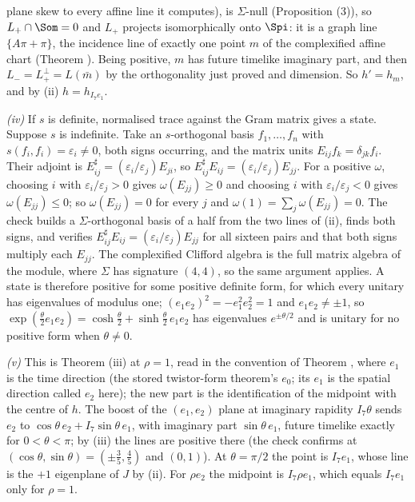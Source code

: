 plane skew to every affine line it computes), is $\Sigma$-null (Proposition (3)), so $L_{+} \cap \Som = 0$ and $L_{+}$ projects isomorphically onto $\Spi$: it is a graph line $\{A\pi + \pi\}$, the incidence line of exactly one point $m$ of the complexified affine chart (Theorem ). Being positive, $m$ has future timelike imaginary part, and then $L_{-} = L_{+}^{\perp} = L(\bar m)$ by the orthogonality just proved and dimension. So $h' = h_{m}$, and by (ii) $h = h_{I_{7}e_{1}}$.

\emph{(iv)} If $s$ is definite, normalised trace against the Gram matrix gives a state. Suppose $s$ is indefinite. Take an $s$-orthogonal basis $f_{1}, \dots, f_{n}$ with $s(f_{i}, f_{i}) = \varepsilon_{i} \ne 0$, both signs occurring, and the matrix units $E_{ij}f_{k} = \delta_{jk}f_{i}$. Their adjoint is $E_{ij}^{\sharp} = (\varepsilon_{i}/\varepsilon_{j})E_{ji}$, so $E_{ij}^{\sharp}E_{ij} = (\varepsilon_{i}/\varepsilon_{j})E_{jj}$. For a positive $\omega$, choosing $i$ with $\varepsilon_{i}/\varepsilon_{j} > 0$ gives $\omega(E_{jj}) \ge 0$ and choosing $i$ with $\varepsilon_{i}/\varepsilon_{j} < 0$ gives $\omega(E_{jj}) \le 0$; so $\omega(E_{jj}) = 0$ for every $j$ and $\omega(1) = \sum_{j}\omega(E_{jj}) = 0$. The check builds a $\Sigma$-orthogonal basis of a half from the two lines of (ii), finds both signs, and verifies $E_{ij}^{\sharp}E_{ij} = (\varepsilon_{i}/\varepsilon_{j})E_{jj}$ for all sixteen pairs and that both signs multiply each $E_{jj}$. The complexified Clifford algebra is the full matrix algebra of the module, where $\Sigma$ has signature $(4,4)$, so the same argument applies. A state is therefore positive for some positive definite form, for which every unitary has eigenvalues of modulus one; $(e_{1}e_{2})^{2} = -e_{1}^{2}e_{2}^{2} = 1$ and $e_{1}e_{2} \ne \pm 1$, so $\exp(\tfrac{\theta}{2}e_{1}e_{2}) = \cosh\tfrac{\theta}{2} + \sinh\tfrac{\theta}{2}\,e_{1}e_{2}$ has eigenvalues $e^{\pm\theta/2}$ and is unitary for no positive form when $\theta \ne 0$.

\emph{(v)} This is Theorem (iii) at $\rho = 1$, read in the convention of Theorem , where $e_{1}$ is the time direction (the stored twistor-form theorem's $e_{0}$; its $e_{1}$ is the spatial direction called $e_{2}$ here); the new part is the identification of the midpoint with the centre of $h$. The boost of the $(e_{1}, e_{2})$ plane at imaginary rapidity $I_{7}\theta$ sends $e_{2}$ to $\cos\theta\,e_{2} + I_{7}\sin\theta\,e_{1}$, with imaginary part $\sin\theta\,e_{1}$, future timelike exactly for $0 < \theta < \pi$; by (iii) the lines are positive there (the check confirms at $(\cos\theta, \sin\theta) = (\pm\tfrac35, \tfrac45)$ and $(0, 1)$). At $\theta = \pi/2$ the point is $I_{7}e_{1}$, whose line is the $+1$ eigenplane of $J$ by (ii). For $\rho e_{2}$ the midpoint is $I_{7}\rho e_{1}$, which equals $I_{7}e_{1}$ only for $\rho = 1$.

